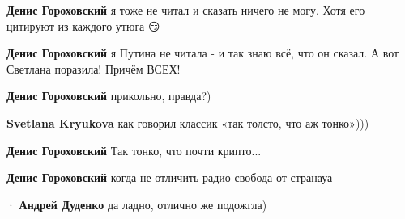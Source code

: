 \begin{itemize}
\begin{itemize}
\textbf{Денис Гороховский} я тоже не читал и сказать ничего не могу. Хотя его цитируют из каждого утюга 😏

 
\textbf{Денис Гороховский} я Путина не читала - и так знаю всё, что он сказал. А вот Светлана поразила! Причём ВСЕХ!


 
\textbf{Денис Гороховский} прикольно, правда?)

 
\textbf{Svetlana Kryukova} как говорил классик «так толсто, что аж тонко»)))

 
\textbf{Денис Гороховский} Так тонко, что почти крипто...

 
\textbf{Денис Гороховский} когда не отличить радио свобода от странауа

 
  · 
\textbf{Андрей Дуденко} да ладно, отлично же подожгла)

 

\end{itemize}
\end{itemize}

